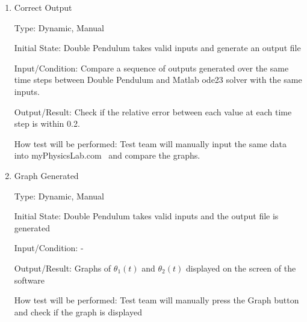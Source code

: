 \documentclass[12pt, titlepage]{article}
\begin{document}
\begin{enumerate}
\item{Correct Output}  

Type: Dynamic, Manual 
          
Initial State: Double Pendulum takes valid inputs and generate an output file
          
Input/Condition: 
Compare a sequence of outputs generated over the same time steps between Double Pendulum and Matlab ode23 solver with the same inputs. 

Output/Result: Check if the relative error between each value at each time step is within 0.2.
          
How test will be performed: Test team will manually input the same data into
myPhysicsLab.com~\cite{Double_Pendulum} and compare the graphs. 

\begin{comment}
\item{File Created}  

Type: Manual
          
Initial State: Double Pendulum takes valid inputs
          
Input/Condition: Press Start button
          
Output/Result: An output file created 
          
How test will be performed: Test team will go to the directory of Double
Pendulum to check the existence of the output file. \wss{This isn't wrong, but
  it isn't a very necessary test.  You need a test to verify that the output is
  correct.  That test implicitly includes this test, so you don't really need to
  separate this out.}

\end{comment}
          
\item{Graph Generated} 

Type: Dynamic, Manual 
          
Initial State: Double Pendulum takes valid inputs and the output file is
generated
          
Input/Condition: - 
          
Output/Result: Graphs of $\theta_1(t)$ and $\theta_2(t)$ displayed on the screen of
the software
          
How test will be performed: Test team will manually press the Graph button and
check if the graph is displayed 



\end{enumerate}
\end{document}

